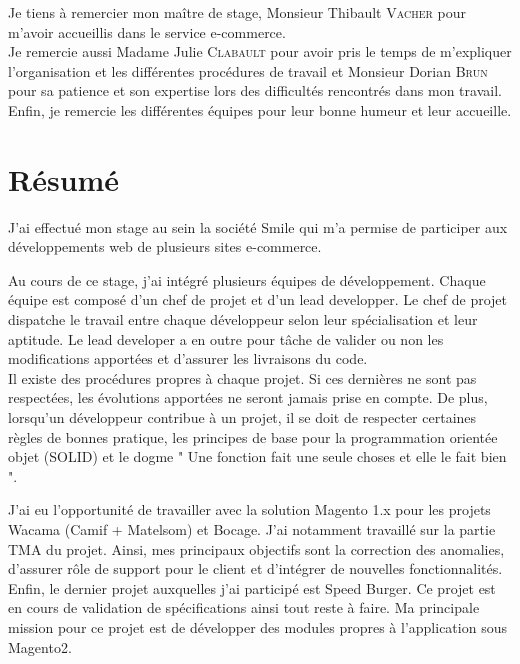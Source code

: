 \documentclass[12pt, a4paper, twoside]{report}
\newcommand{\mychapter}[2]{
	\setcounter{chapter}{#1}
	\setcounter{section}{0}
	\chapter*{#2}
	\addcontentsline{toc}{chapter}{#2}
}
\begin{document}
Je tiens à remercier mon maître de stage, Monsieur Thibault \textsc{Vacher} pour m'avoir accueillis dans le service e-commerce. \\

Je remercie aussi Madame Julie \textsc{Clabault} pour avoir pris le temps de m'expliquer l'organisation et les différentes procédures de travail et Monsieur Dorian \textsc{Brun} pour sa patience et son expertise lors des difficultés rencontrés dans mon travail. \\

Enfin, je remercie les différentes équipes pour leur bonne humeur et leur accueille.


\newpage\null\thispagestyle{empty}\newpage

\setcounter{tocdepth}{2}
\begingroup\makeatletter
\def\@makeschapterhead#1{%
	{\parindent \z@ \raggedright
		\normalfont
		\interlinepenalty\@M
		\Huge \bfseries  #1\par\nobreak
}}\makeatother
\tableofcontents
\endgroup




\mychapter{-4}{Résumé}

J’ai effectué mon stage au sein la société Smile qui m'a permise de participer aux développements web de plusieurs sites e-commerce. \vspace{0.1cm}

Au cours de ce stage, j'ai intégré plusieurs équipes de développement. Chaque équipe est composé d'un chef de projet et d'un lead developper. Le chef de projet dispatche le travail entre chaque développeur selon leur spécialisation et leur aptitude. Le lead developer a en outre pour tâche de valider ou non les modifications apportées et d'assurer les livraisons du code. \\
Il existe des procédures propres à chaque projet. Si ces dernières ne sont pas respectées, les évolutions apportées ne seront jamais prise en compte. De plus, lorsqu'un développeur contribue à un projet, il se doit de respecter certaines règles de bonnes pratique, les principes de base pour la programmation orientée objet (SOLID) et le dogme " Une fonction fait une seule choses et elle le fait bien ". \vspace{0.1cm}

J'ai eu l'opportunité de travailler avec la solution Magento 1.x pour les projets Wacama (Camif + Matelsom) et Bocage. J'ai notamment travaillé sur la partie TMA du projet. Ainsi, mes principaux objectifs sont la correction des anomalies, d'assurer rôle de support pour le client et d'intégrer de nouvelles fonctionnalités. \\
Enfin, le dernier projet auxquelles j'ai participé est Speed Burger. Ce projet est en cours de validation de spécifications ainsi tout reste à faire. Ma principale mission pour ce projet est de développer des modules propres à l'application sous Magento2. \vspace{0.1cm}
\end{document}
